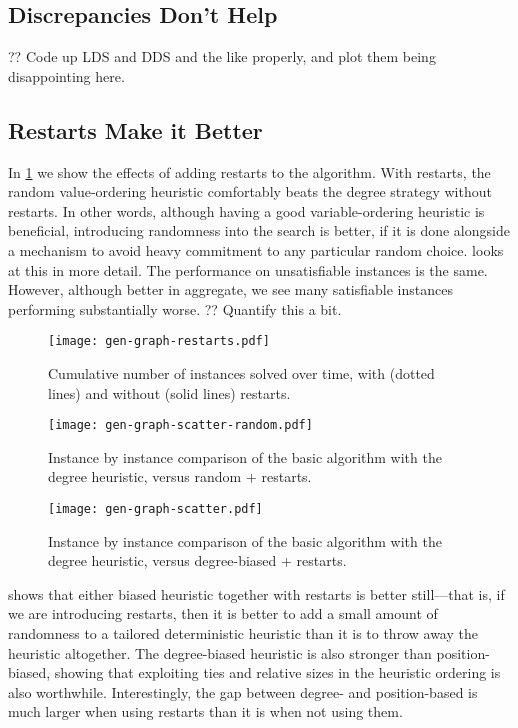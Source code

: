 \documentclass{article}
\begin{document}
\subsection{Discrepancies Don't Help}

?? Code up LDS and DDS and the like properly, and plot them being disappointing here.

\subsection{Restarts Make it Better}

In \cref{figure:restarts} we show the effects of adding restarts to the algorithm. With restarts,
the random value-ordering heuristic comfortably beats the degree strategy without restarts. In
other words, although having a good variable-ordering heuristic is beneficial, introducing
randomness into the search is better, if it is done alongside a mechanism to avoid heavy commitment
to any particular random choice.  looks at this in more detail.  The
performance on unsatisfiable instances is the same. However, although better in aggregate, we see
many satisfiable instances performing substantially worse. ?? Quantify this a bit.

\begin{figure}[p]
    \centering
    \texttt{[image: gen-graph-restarts.pdf]}

    \caption{Cumulative number of instances solved over time, with (dotted lines) and without (solid
    lines) restarts.}
    \label{figure:restarts}
\end{figure}

\begin{figure}[p]
    \centering
    \texttt{[image: gen-graph-scatter-random.pdf]}
    \caption{Instance by instance comparison of the basic algorithm with the degree heuristic,
    versus random + restarts.}
    \label{figure:scatter-random}
\end{figure}

\begin{figure}[p]
    \centering
    \texttt{[image: gen-graph-scatter.pdf]}

    \caption{Instance by instance comparison of the basic algorithm with the degree heuristic,
    versus degree-biased + restarts.}
    \label{figure:scatter}
\end{figure}

 shows that either biased heuristic together with restarts is better
still---that is, if we are introducing restarts, then it is better to add a small amount of
randomness to a tailored deterministic heuristic than it is to throw away the heuristic altogether.
The degree-biased heuristic is also stronger than position-biased, showing that exploiting ties and
relative sizes in the heuristic ordering is also worthwhile. Interestingly, the gap between degree-
and position-based is much larger when using restarts than it is when not using them.
\end{document}
